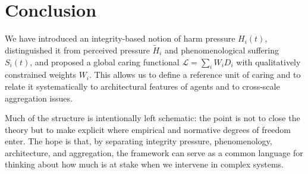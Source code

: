 \documentclass[11pt]{article}
\begin{document}
\section{Conclusion}

We have introduced an integrity-based notion of harm pressure $H_i(t)$, distinguished it from perceived pressure $\tilde H_i$ and phenomenological suffering $S_i(t)$, and proposed a global caring functional $\mathcal L = \sum_i W_i D_i$ with qualitatively constrained weights $W_i$. This allows us to define a reference unit of caring and to relate it systematically to architectural features of agents and to cross-scale aggregation issues.

Much of the structure is intentionally left schematic: the point is not to close the theory but to make explicit where empirical and normative degrees of freedom enter. The hope is that, by separating integrity pressure, phenomenology, architecture, and aggregation, the framework can serve as a common language for thinking about how much is at stake when we intervene in complex systems.



\end{document}
